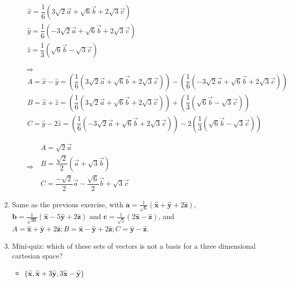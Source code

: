 \documentclass[fleqn]{article}
\begin{document}
\begin{enumerate}
\begin{enumerate}
$
\begin{array}{lll}
  \hat{x}= \dfrac{1}{6}(3\sqrt{2}\overrightarrow{a}+\sqrt{6}\overrightarrow{b}+2\sqrt{3}\overrightarrow{c}) \\
  \hat{y}= \dfrac{1}{6}(-3\sqrt{2}\overrightarrow{a}+\sqrt{6}\overrightarrow{b}+2\sqrt{3}\overrightarrow{c}) \\
  \hat{z}= \dfrac{1}{3}(\sqrt{6}\overrightarrow{b}-\sqrt{3}\overrightarrow{c})
  \end{array}  
$


$\Rightarrow$ 
$
\begin{array}{lll}
  A = \hat{x}-\hat{y}=(\dfrac{1}{6}(3\sqrt{2}\overrightarrow{a}+\sqrt{6}\overrightarrow{b}+2\sqrt{3}\overrightarrow{c}))-(\dfrac{1}{6}(-3\sqrt{2}\overrightarrow{a}+\sqrt{6}\overrightarrow{b}+2\sqrt{3}\overrightarrow{c})) \\
  B = \hat{x}+\hat{z}= (\dfrac{1}{6}(3\sqrt{2}\overrightarrow{a}+\sqrt{6}\overrightarrow{b}+2\sqrt{3}\overrightarrow{c}))+(\dfrac{1}{3}(\sqrt{6}\overrightarrow{b}-\sqrt{3}\overrightarrow{c}))\\
  C = \hat{y}-2\hat{z}=(\dfrac{1}{6}(-3\sqrt{2}\overrightarrow{a}+\sqrt{6}\overrightarrow{b}+2\sqrt{3}\overrightarrow{c}))-2(\dfrac{1}{3}(\sqrt{6}\overrightarrow{b}-\sqrt{3}\overrightarrow{c}))
\end{array}  
$

\bigbreak

$\Rightarrow$ 
$
\begin{array}{lll}
  A = \sqrt{2}\overrightarrow{a} \\
  B = \dfrac{\sqrt{2}}{2}(\overrightarrow{a}+\sqrt{3}\overrightarrow{b}) \\
  C = \dfrac{-\sqrt{2}}{2}\overrightarrow{a}-\dfrac{\sqrt{6}}{2}\overrightarrow{b}+\sqrt{3}\overrightarrow{c} 
\end{array}  
$

\end{enumerate}


\item Same as the previous exercise, with $\mathbf{a}=\frac{1}{\sqrt{6}} ( \mathbf{\hat{x}} + \mathbf{\hat{y}} + 2 \mathbf{\hat{z}} ) $, $\mathbf{b}=\frac{1}{\sqrt{30}} (\mathbf{\hat{x}} - 5\mathbf{\hat{y}} + 2\mathbf{\hat{z}})$ and $\mathbf{c}= \frac{1}{\sqrt{5}} ( 2 \mathbf{\hat{x} }- \mathbf{\hat{z} })$, and 
$A=\mathbf{\hat{x}}+\mathbf{\hat{y}}+2\mathbf{\hat{z}}; B=\mathbf{\hat{x}}-\mathbf{\hat{y}}+2\mathbf{\hat{z}}; C=\mathbf{\hat{y}}-\mathbf{\hat{z}}$. 


\item Mini-quiz: which of these sets of vectors is not a basis for a three dimensional cartesian space? 
\begin{itemize}
\item $\{ \mathbf{\hat{x}}, \mathbf{\hat{x}}+3\mathbf{\hat{y}}, 3\mathbf{\hat{x}}-\mathbf{\hat{y}} \}$


\end{itemize}
\end{enumerate}
\end{document}
